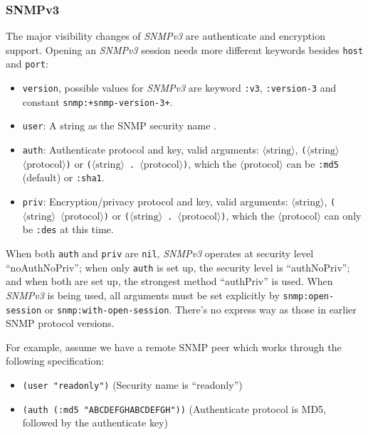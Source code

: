 \documentclass[reprint,natbib,9pt]{sigplanconf}
\begin{document}
\subsubsection{SNMPv3}

The major visibility changes of \textsl{SNMPv3} \cite{RFC:3411} are authenticate
and encryption support.
Opening an \textsl{SNMPv3} session needs more different keywords
besides \texttt{host} and \texttt{port}:

\begin{itemize}
\item \texttt{version}, possible values for \textsl{SNMPv3} are
  keyword \texttt{:v3}, \texttt{:version-3} and constant
  \texttt{snmp:+snmp-version-3+}.

\item \texttt{user}: A string as the SNMP security name \cite{RFC:3414}.

\item \texttt{auth}: Authenticate protocol and key, valid arguments:
  $\langle\mathrm{string}\rangle$,
  \texttt{($\langle\mathrm{string}\rangle$
    $\langle\mathrm{protocol}\rangle$)} or
  \texttt{($\langle\mathrm{string}\rangle$
    . $\langle\mathrm{protocol}\rangle$)}, which the
  \texttt{$\langle\mathrm{protocol}\rangle$} can be \texttt{:md5}
  (default) or \texttt{:sha1}.

\item \texttt{priv}: Encryption/privacy protocol and key, valid
  arguments: $\langle\mathrm{string}\rangle$,
  \texttt{($\langle\mathrm{string}\rangle$
    $\langle\mathrm{protocol}\rangle$)} or
  \texttt{($\langle\mathrm{string}\rangle$
    . $\langle\mathrm{protocol}\rangle$)}, which the
  \texttt{$\langle\mathrm{protocol}\rangle$} can only be \texttt{:des}
  at this time.
\end{itemize}

When both \texttt{auth} and \texttt{priv} are \texttt{nil},
\textsl{SNMPv3} operates at security level ``noAuthNoPriv''; when only
\texttt{auth} is set up, the security level is ``authNoPriv''; and
when both are set up, the strongest method ``authPriv'' is used. When
\textsl{SNMPv3} is being used, all arguments must be set explicitly by
\texttt{snmp:open-session} or \texttt{snmp:with-open-session}. There's
no express way as those in earlier SNMP protocol versions.

For example, assume we have a remote SNMP peer which works through the
following specification:
%
\begin{itemize}
\item \texttt{(user "readonly")} (Security name is ``readonly'')
\item \texttt{(auth (:md5 "ABCDEFGHABCDEFGH"))} (Authenticate protocol
  is MD5, followed by the authenticate key)
\end{itemize}
\end{document}
